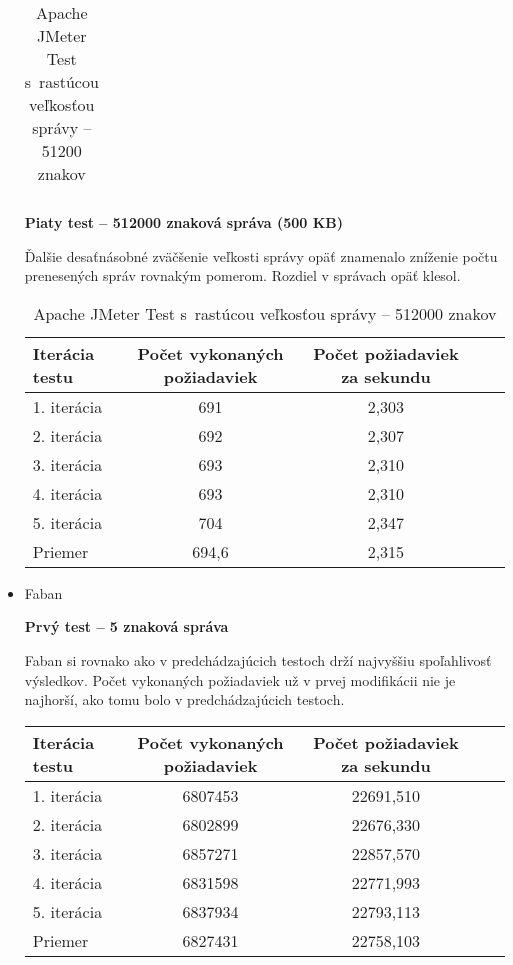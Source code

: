\documentclass[12pt,oneside,final]{fithesis-utf8}
\begin{document}
\begin{itemize}
\begin{table}[H]
\begin{center}
\begin{tabular}{ | l | c | c | c | c |}
\end{tabular}
\end{center}
\caption{Apache JMeter Test s~rastúcou veľkosťou správy -- 51200 znakov}
\end{table}


\textbf{Piaty test -- 512000 znaková správa (500 KB)}

Ďalšie desaťnásobné zväčšenie veľkosti správy opäť znamenalo zníženie počtu prenesených správ rovnakým pomerom. Rozdiel v správach opäť klesol.

\begin{table}[H]
\begin{center}
\begin{tabular}{ | l | c | c | c | c |}
		\hline
		 \textbf{Iterácia testu} & \textbf{Počet vykonaných požiadaviek} & \textbf{Počet požiadaviek za sekundu} \\ \hline
		 1. iterácia & 691 & 2,303 \\ \hline
		 2. iterácia & 692 & 2,307 \\ \hline
		 3. iterácia & 693 & 2,310 \\ \hline
		 4. iterácia & 693 & 2,310 \\ \hline
		 5. iterácia & 704 & 2,347 \\ \hline
		 Priemer & 694,6 & 2,315 \\ \hline
		 
\end{tabular}
\end{center}
\caption{Apache JMeter Test s~rastúcou veľkosťou správy -- 512000 znakov}
\end{table}

\item Faban

\textbf{Prvý test -- 5 znaková správa}

Faban si rovnako ako v predchádzajúcich testoch drží najvyššiu spoľahlivosť výsledkov. Počet vykonaných požiadaviek už v prvej modifikácii nie je najhorší, ako tomu bolo v predchádzajúcich testoch.

\begin{table}[H]
\begin{center}
\begin{tabular}{ | l | c | c | c | c |}
		\hline
		 \textbf{Iterácia testu} & \textbf{Počet vykonaných požiadaviek} & \textbf{Počet požiadaviek za sekundu} \\ \hline
		 1. iterácia & 6807453 & 22691,510 \\ \hline
		 2. iterácia & 6802899 & 22676,330 \\ \hline
		 3. iterácia & 6857271 & 22857,570 \\ \hline
		 4. iterácia & 6831598 & 22771,993 \\ \hline
		 5. iterácia & 6837934 & 22793,113 \\ \hline
		 Priemer & 6827431 & 22758,103 \\ \hline
		 

\end{tabular}
\end{center}
\end{table}
\end{itemize}
\end{document}
